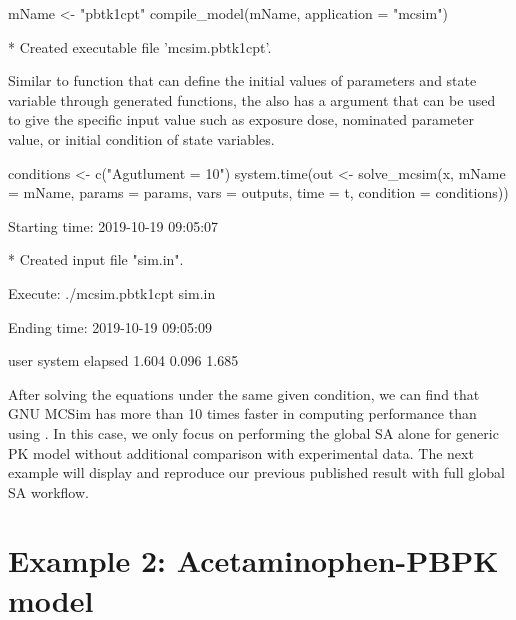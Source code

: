 \begin{Schunk}
\begin{Sinput}
mName <- "pbtk1cpt"
compile_model(mName, application = "mcsim")
\end{Sinput}
\begin{Soutput}
  * Created executable file 'mcsim.pbtk1cpt'.
\end{Soutput}
\end{Schunk}

Similar to  function that can define the initial values
of parameters and state variable through generated functions, the
 also has a  argument that can be
used to give the specific input value such as exposure dose, nominated
parameter value, or initial condition of state variables.

\begin{Schunk}
\begin{Sinput}
conditions <- c("Agutlument = 10") 
system.time(out <- solve_mcsim(x, mName = mName, params = params, 
                               vars = outputs, time = t, 
                               condition = conditions))
\end{Sinput}
\begin{Soutput}
  Starting time: 2019-10-19 09:05:07
\end{Soutput}
\begin{Soutput}
  * Created input file "sim.in".
\end{Soutput}
\begin{Soutput}
  Execute: ./mcsim.pbtk1cpt sim.in
\end{Soutput}
\begin{Soutput}
  Ending time: 2019-10-19 09:05:09
\end{Soutput}
\begin{Soutput}
     user  system elapsed 
    1.604   0.096   1.685
\end{Soutput}
\end{Schunk}

After solving the equations under the same given condition, we can find
that GNU MCSim has more than 10 times faster in computing performance
than using . In this case, we only focus on performing
the global SA alone for generic PK model without additional comparison
with experimental data. The next example will display and reproduce our
previous published result \citep{fphar201800588} with full global SA
workflow.

\hypertarget{example-2-acetaminophen-pbpk-model}{%
\section{Example 2: Acetaminophen-PBPK
model}\label{example-2-acetaminophen-pbpk-model}}

